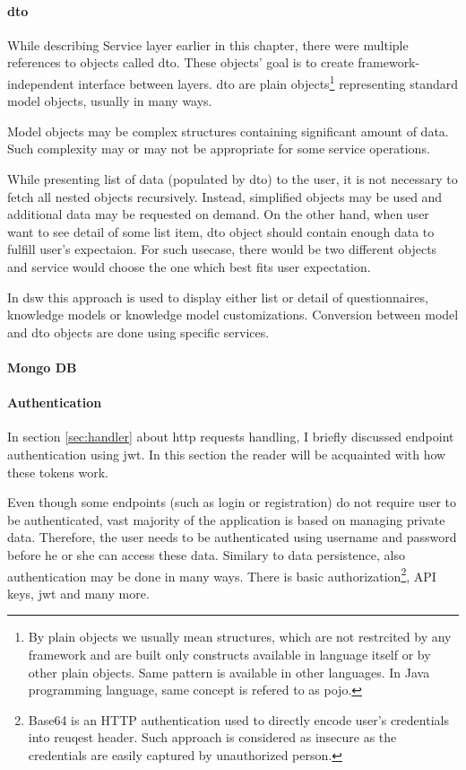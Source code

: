 \paragraph*{\gls{dto}} While describing Service layer earlier in this chapter, there were multiple references to objects called \gls{dto}.
These objects' goal is to create framework-independent interface between layers.
\gls{dto} are plain objects\footnote{By plain objects we usually mean structures, which are not restrcited by any framework and are built only constructs available in language itself or by other plain objects. Same pattern is available in other languages. In Java programming language, same concept is refered to as \gls{pojo}\cite{wiki-pojo}.} representing standard model objects, usually in many ways.

Model objects may be complex structures containing significant amount of data.
Such complexity may or may not be appropriate for some service operations.

While presenting list of data (populated by \gls{dto}) to the user, it is not necessary to fetch all nested objects recursively.
Instead, simplified objects may be used and additional data may be requested on demand.
On the other hand, when user want to see detail of some list item, \gls{dto} object should contain enough data to fulfill user's expectaion.
For such usecase, there would be two different objects and service would choose the one which best fits user expectation.


In \gls{dsw} this approach is used to display either list or detail of questionnaires, knowledge models or knowledge model customizations.
Conversion between model and \gls{dto} objects are done using specific services.

\paragraph*{Mongo DB}

\paragraph*{Authentication} In section \ref{sec:handler} about \gls{http} requests handling, I briefly discussed endpoint authentication using \gls{jwt}.
In this section the reader will be acquainted with how these tokens work.

Even though some endpoints (such as login or registration) do not require user to be authenticated, vast majority of the application is based on managing private data.
Therefore, the user needs to be authenticated using username and password before he or she can access these data.
Similary to data persistence, also authentication may be done in many ways.
There is basic authorization\footnote{Base64 is an HTTP authentication used to directly encode user's credentials into reuqest header. Such approach is considered as insecure as the credentials are easily captured by unauthorized person\cite{qnimate-base64}.}, API keys, \gls{jwt} and many more.

